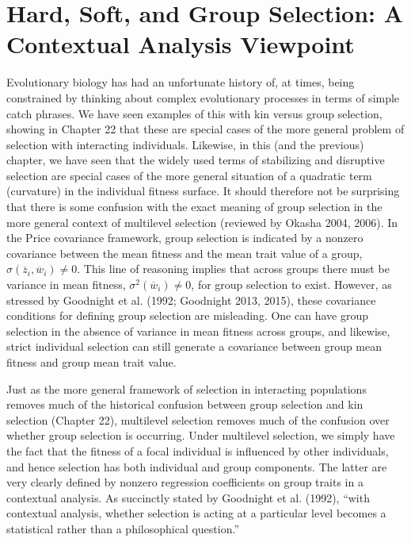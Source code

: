 \documentclass{article}
\begin{document}
\section{Hard, Soft, and Group Selection: A Contextual Analysis Viewpoint}
Evolutionary biology has had an unfortunate history of, at times, being constrained by thinking about complex evolutionary processes in terms of simple catch phrases. We have seen examples of this with kin versus group selection, showing in Chapter 22 that these are special cases of the more general problem of selection with interacting individuals. Likewise, in this (and the previous) chapter, we have seen that the widely used terms of stabilizing and disruptive selection are special cases of the more general situation of a quadratic term (curvature) in the individual fitness surface. It should therefore not be surprising that there is some confusion with the exact meaning of group selection in the more general context of multilevel selection (reviewed by Okasha 2004, 2006). In the Price covariance framework, group selection is indicated by a nonzero covariance between the mean fitness and the mean trait value of a group,  $ \sigma(\overline{z}_i, \overline{w}_i) \neq 0 $. This line of reasoning implies that across groups there must be variance in mean fitness,  $ \sigma^2(\overline{w}_i) \neq 0 $, for group selection to exist. However, as stressed by Goodnight et al. (1992; Goodnight 2013, 2015), these covariance conditions for defining group selection are misleading. One can have group selection in the absence of variance in mean fitness across groups, and likewise, strict individual selection can still generate a covariance between group mean fitness and group mean trait value.

Just as the more general framework of selection in interacting populations removes much of the historical confusion between group selection and kin selection (Chapter 22), multilevel selection removes much of the confusion over whether group selection is occurring. Under multilevel selection, we simply have the fact that the fitness of a focal individual is influenced by other individuals, and hence selection has both individual and group components. The latter are very clearly defined by nonzero regression coefficients on group traits in a contextual analysis. As succinctly stated by Goodnight et al. (1992), “with contextual analysis, whether selection is acting at a particular level becomes a statistical rather than a philosophical question.”
\end{document}
